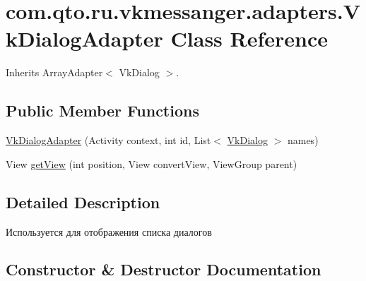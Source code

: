 \hypertarget{classcom_1_1qto_1_1ru_1_1vkmessanger_1_1adapters_1_1_vk_dialog_adapter}{}\section{com.\+qto.\+ru.\+vkmessanger.\+adapters.\+Vk\+Dialog\+Adapter Class Reference}
\label{classcom_1_1qto_1_1ru_1_1vkmessanger_1_1adapters_1_1_vk_dialog_adapter}


Inherits Array\+Adapter$<$ Vk\+Dialog $>$.

\subsection*{Public Member Functions}
\begin{DoxyCompactItemize}
\item 
\hyperlink{classcom_1_1qto_1_1ru_1_1vkmessanger_1_1adapters_1_1_vk_dialog_adapter_a820854723e038e4cf8872b326704b82a}{Vk\+Dialog\+Adapter} (Activity context, int id, List$<$ \hyperlink{classcom_1_1qto_1_1ru_1_1vkmessanger_1_1vk_1_1_vk_dialog}{Vk\+Dialog} $>$ names)
\item 
View \hyperlink{classcom_1_1qto_1_1ru_1_1vkmessanger_1_1adapters_1_1_vk_dialog_adapter_a2a01483ef814ab7c9217fbbcf260d61d}{get\+View} (int position, View convert\+View, View\+Group parent)
\end{DoxyCompactItemize}


\subsection{Detailed Description}
Используется для отображения списка диалогов 

\subsection{Constructor \& Destructor Documentation}
\hypertarget{classcom_1_1qto_1_1ru_1_1vkmessanger_1_1adapters_1_1_vk_dialog_adapter_a820854723e038e4cf8872b326704b82a}{}
